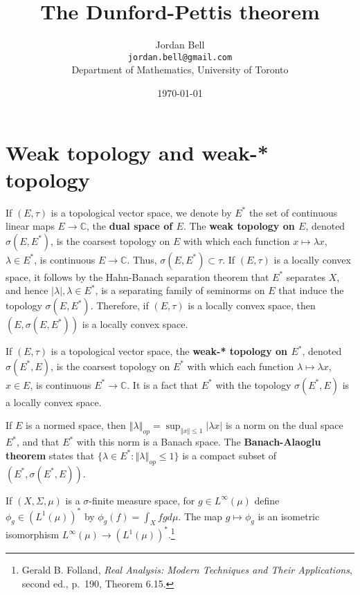 \documentclass{article}
\newcommand{\norm}[1]{\left\Vert #1 \right\Vert}
\theoremstyle{definition}
\begin{document}
\title{The Dunford-Pettis theorem}
\author{Jordan Bell\\ \texttt{jordan.bell@gmail.com}\\Department of Mathematics, University of Toronto}
\date{\today}

\maketitle

\section{Weak topology and weak-* topology}
If $(E,\tau)$ is a topological vector space, we denote by $E^*$ the set of continuous linear maps $E \to \mathbb{C}$, 
the \textbf{dual space of $E$}. 
The \textbf{weak topology on $E$}, denoted $\sigma(E,E^*)$, is the coarsest topology on $E$ with which
each function $x \mapsto \lambda x$, $\lambda \in E^*$, is continuous $E \to \mathbb{C}$.
Thus, $\sigma(E,E^*) \subset \tau$. 
If $(E,\tau)$ is a locally convex space, it follows by the Hahn-Banach separation theorem that $E^*$ separates $X$, and hence 
$|\lambda|, \lambda \in E^*$, is a separating family of seminorms on $E$ that induce the topology $\sigma(E,E^*)$. Therefore,
if $(E,\tau)$ is a locally convex space, then $(E,\sigma(E,E^*))$ is a locally convex space. 

If $(E,\tau)$ is a topological vector space, the \textbf{weak-* topology on $E^*$}, denoted
$\sigma(E^*,E)$, is the coarsest topology on $E^*$ with which each function
$\lambda \mapsto \lambda x$, $x \in E$, is continuous $E^* \to \mathbb{C}$. It is a fact that  $E^*$ with the topology
$\sigma(E^*,E)$ is a locally convex space.

If $E$ is a normed space, then $\norm{\lambda}_{op} = \sup_{\norm{x} \leq 1} |\lambda x|$ is a norm on the dual
space $E^*$, and that $E^*$ with this norm is a Banach space. The \textbf{Banach-Alaoglu theorem} states that $\{\lambda \in E^*: \norm{\lambda}_{op} \leq 1\}$
is a compact subset of $(E^*, \sigma(E^*,E))$.


If $(X,\Sigma,\mu)$ is a $\sigma$-finite measure space, for
$g \in L^\infty(\mu)$ define $\phi_g \in (L^1(\mu))^*$ by
$\phi_g(f) = \int_X fg d\mu$. The map
$g \mapsto \phi_g$ is an isometric isomorphism
$L^\infty(\mu) \to  (L^1(\mu))^*$.\footnote{Gerald B. Folland, {\em Real Analysis: Modern Techniques and Their Applications},
second ed., p.~190, Theorem 6.15.} 
\end{document}
